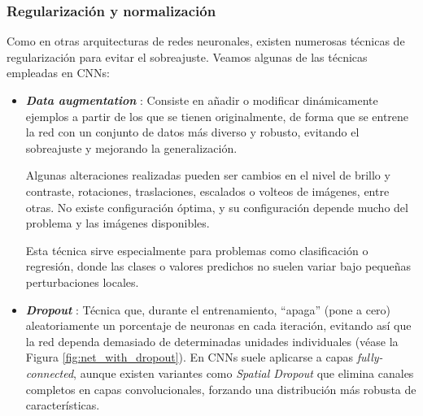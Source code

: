 \subsubsection{Regularización y normalización}

Como en otras arquitecturas de redes neuronales, existen numerosas técnicas de regularización para evitar
el sobreajuste. Veamos algunas de las técnicas empleadas en CNNs:

\begin{itemize}

    \item \textbf{\textit{Data augmentation}} \cite{chen2019,zhang2021}: Consiste en añadir o modificar 
    dinámicamente ejemplos a partir de los que se tienen originalmente, de forma que se entrene la red con 
    un conjunto de datos más diverso y robusto, evitando el sobreajuste y mejorando la generalización.
    
    Algunas alteraciones realizadas pueden ser cambios en el nivel de brillo y contraste, rotaciones, 
    traslaciones, escalados o volteos de imágenes, entre otras. No existe configuración óptima, y su 
    configuración depende mucho del problema y las imágenes disponibles.

    Esta técnica sirve especialmente para problemas como clasificación o regresión, donde las clases o valores 
    predichos no suelen variar bajo pequeñas perturbaciones locales. 
    
    \item \textbf{\textit{Dropout}} \cite{srivastava2014}: Técnica que, durante el entrenamiento, ``apaga'' 
    (pone a cero) aleatoriamente un porcentaje de neuronas en cada iteración, evitando así que la red 
    dependa demasiado de determinadas unidades individuales (véase la Figura \ref{fig:net_with_dropout}). 
    En CNNs suele aplicarse a capas \textit{fully-connected}, 
    aunque existen variantes como \textit{Spatial Dropout} \cite{tompson2015} que elimina canales completos 
    en capas convolucionales, forzando una distribución más robusta de características.

    \begin{figure}[h]
        \centering


\end{figure}
\end{itemize}
